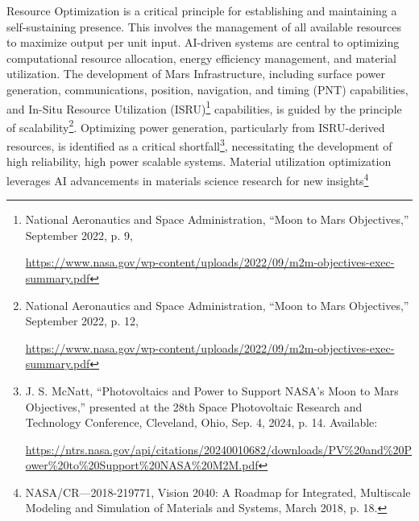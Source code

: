 \documentclass[fontsize=10pt, oneside, DIV=calc]{scrartcl}
\begin{document}
\medskip

\noindent
Resource Optimization is a critical principle for establishing and maintaining a self-sustaining presence. This involves the management of all available resources to maximize output per unit input. AI-driven systems are central to optimizing computational resource allocation, energy efficiency management, and material utilization. The development of Mars Infrastructure, including surface power generation, communications, position, navigation, and timing (PNT) capabilities, and In-Situ Resource Utilization (ISRU)\footnote{National Aeronautics and Space Administration, ``Moon to Mars Objectives,'' September 2022, p. 9, 











\href{https://www.nasa.gov/wp-content/uploads/2022/09/m2m-objectives-exec-summary.pdf}\url{https://www.nasa.gov/wp-content/uploads/2022/09/m2m-objectives-exec-summary.pdf}} capabilities, is guided by the principle of scalability\footnote{National Aeronautics and Space Administration, ``Moon to Mars Objectives,'' September 2022, p. 12, 











\href{https://www.nasa.gov/wp-content/uploads/2022/09/m2m-objectics-exec-summary.pdf}\url{https://www.nasa.gov/wp-content/uploads/2022/09/m2m-objectives-exec-summary.pdf}}. Optimizing power generation, particularly from ISRU-derived resources, is identified as a critical shortfall\footnote{J. S. McNatt, ``Photovoltaics and Power to Support NASA’s Moon to Mars Objectives,'' presented at the 28th Space Photovoltaic Research and Technology Conference, Cleveland, Ohio, Sep. 4, 2024, p. 14. Available: 











\href{https://ntrs.nasa.gov/api/citations/20240010682/downloads/PV\%20and\%20Power\%20to\%20Support\%20NASA\%20M2M.pdf}\url{https://ntrs.nasa.gov/api/citations/20240010682/downloads/PV\%20and\%20Power\%20to\%20Support\%20NASA\%20M2M.pdf}}, necessitating the development of high reliability, high power scalable systems. Material utilization optimization leverages AI advancements in materials science research for new insights\footnote{NASA/CR—2018-219771, Vision 2040: A Roadmap for Integrated, Multiscale Modeling and Simulation of Materials and Systems, March 2018, p. 18. 











}
\end{document}
